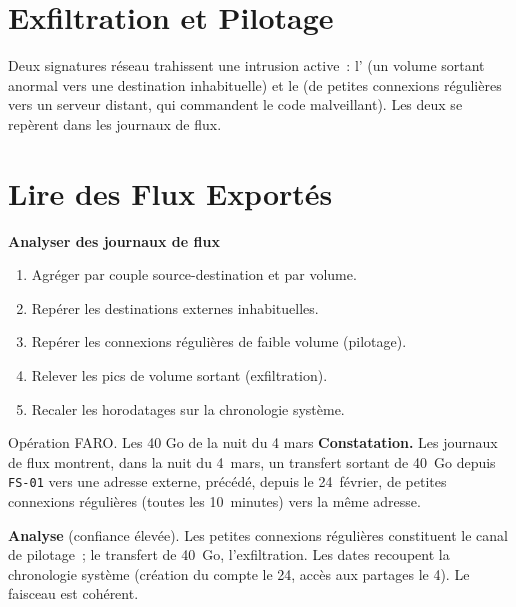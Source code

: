 \section{Exfiltration et Pilotage}
\label{sec:c14-exfil}

Deux signatures réseau trahissent une intrusion active~: l'
(un volume sortant anormal vers une destination inhabituelle) et le
 (de petites connexions régulières vers un serveur
distant, qui commandent le code malveillant). Les deux se repèrent dans les
journaux de flux.

\section{Lire des Flux Exportés}
\label{sec:c14-flux}

\begin{boxprocedure}
\textbf{Analyser des journaux de flux}
\begin{enumerate}
    \item Agréger par couple source-destination et par volume.
    \item Repérer les destinations externes inhabituelles.
    \item Repérer les connexions régulières de faible volume (pilotage).
    \item Relever les pics de volume sortant (exfiltration).
    \item Recaler les horodatages sur la chronologie système.
\end{enumerate}
\end{boxprocedure}

\begin{boxscenario}{Opération FARO. Les 40 Go de la nuit du 4 mars}
\textbf{Constatation.} Les journaux de flux montrent, dans la nuit du 4~mars,
un transfert sortant de 40~Go depuis \texttt{FS-01} vers une adresse externe,
précédé, depuis le 24~février, de petites connexions régulières (toutes les
10~minutes) vers la même adresse.

\medskip
\textbf{Analyse} (confiance élevée). Les petites connexions régulières
constituent le canal de pilotage~; le transfert de 40~Go, l'exfiltration. Les
dates recoupent la chronologie système (création du compte le 24, accès aux
partages le 4). Le faisceau est cohérent.
\end{boxscenario}

